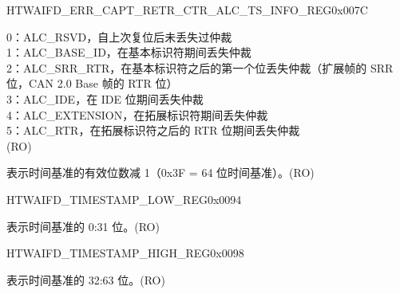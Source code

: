 \begin{register}{H}{TWAIFD\_ERR\_CAPT\_RETR\_CTR\_ALC\_TS\_INFO\_REG}{0x007C}
\begin{regdesc}
\begin{reglist}
0：ALC\_RSVD，自上次复位后未丢失过仲裁\\
1：ALC\_BASE\_ID，在基本标识符期间丢失仲裁\\
2：ALC\_SRR\_RTR，在基本标识符之后的第一个位丢失仲裁（扩展帧的 SRR 位，CAN 2.0 Base 帧的 RTR 位）\\
3：ALC\_IDE，在 IDE 位期间丢失仲裁\\
4：ALC\_EXTENSION，在拓展标识符期间丢失仲裁\\
5：ALC\_RTR，在拓展标识符之后的 RTR 位期间丢失仲裁\\(RO)
\label{fielddesc:TWAIFDTSBITS}\item [TWAIFD\_TS\_BITS] 表示时间基准的有效位数减 1（0x3F = 64 位时间基准）。(RO)
\end{reglist}\end{regdesc}
\end{register}


\begin{register}{H}{TWAIFD\_TIMESTAMP\_LOW\_REG}{0x0094}\label{regdesc:TWAIFDTIMESTAMPLOWREG}
%
\regnewline%
\begin{regdesc}\begin{reglist}
\label{fielddesc:TWAIFDTIMESTAMPLOW}\item [TWAIFD\_TIMESTAMP\_LOW] 表示时间基准的 0:31 位。(RO)
\end{reglist}\end{regdesc}
\end{register}


\begin{register}{H}{TWAIFD\_TIMESTAMP\_HIGH\_REG}{0x0098}\label{regdesc:TWAIFDTIMESTAMPHIGHREG}
%
\regnewline%
\begin{regdesc}\begin{reglist}
\label{fielddesc:TWAIFDTIMESTAMPHIGH}\item [TWAIFD\_TIMESTAMP\_HIGH] 表示时间基准的 32:63 位。(RO)
\end{reglist}\end{regdesc}
\end{register}


